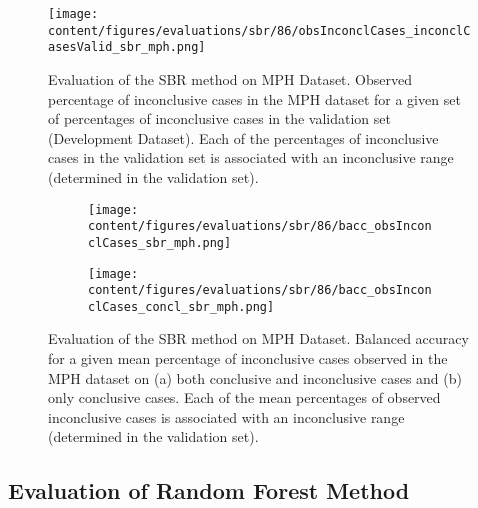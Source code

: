 

\begin{figure}[h]
  \centering
  \texttt{[image: content/figures/evaluations/sbr/86/obsInconclCases\_inconclCasesValid\_sbr\_mph.png]}
  \caption{Evaluation of the SBR method on MPH Dataset.
  Observed percentage of inconclusive cases in the MPH dataset 
  for a given set of percentages of inconclusive cases in the validation set (Development Dataset).
  Each of the percentages of inconclusive cases in the validation set is associated 
  with an inconclusive range (determined in the validation set).} 
  \label{fig:obsInconclCases_inconclCasesValid_sbr_mph}
\end{figure} 


\begin{figure}[t]
  \begin{subfigure}{0.9\textwidth}
    \centering
    \texttt{[image: content/figures/evaluations/sbr/86/bacc\_obsInconclCases\_sbr\_mph.png]}
    \subcaption{}
    \label{fig:bacc_obsInconclCases_sbr_mph}
  \end{subfigure}
  \hfill
  \begin{subfigure}{0.9\textwidth}
    \centering
    \texttt{[image: content/figures/evaluations/sbr/86/bacc\_obsInconclCases\_concl\_sbr\_mph.png]}
    \subcaption{}
    \label{fig:bacc_obsInconclCases_concl_sbr_mph}
  \end{subfigure}

  \caption{Evaluation of the SBR method on MPH Dataset.
  Balanced accuracy for a given mean percentage of inconclusive cases observed in the MPH dataset on 
  (a) both conclusive and inconclusive cases and (b) only conclusive cases. 
  Each of the mean percentages of observed inconclusive cases is associated 
  with an inconclusive range (determined in the validation set). }
  \label{fig:bacc_obsInconclCases_sbr_mph_full}
\end{figure}




\subsection{Evaluation of Random Forest Method}
\label{subsec:eval_rfc}


